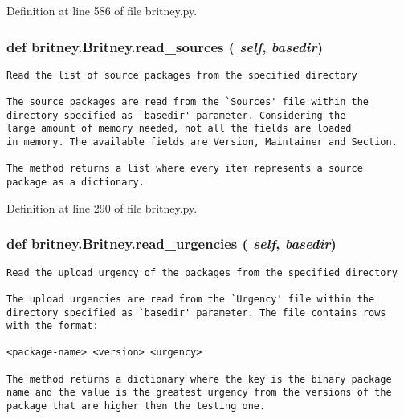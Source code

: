 Definition at line 586 of file britney.py.
\subsubsection{\setlength{\rightskip}{0pt plus 5cm}def britney.Britney.read\_\-sources ( {\em self},  {\em basedir})}\label{classbritney_1_1Britney_054f44c47f17c0c4f5a069e821b7f868}




\footnotesize\begin{verbatim}Read the list of source packages from the specified directory

The source packages are read from the `Sources' file within the
directory specified as `basedir' parameter. Considering the
large amount of memory needed, not all the fields are loaded
in memory. The available fields are Version, Maintainer and Section.

The method returns a list where every item represents a source
package as a dictionary.
\end{verbatim}
\normalsize
 

Definition at line 290 of file britney.py.
\subsubsection{\setlength{\rightskip}{0pt plus 5cm}def britney.Britney.read\_\-urgencies ( {\em self},  {\em basedir})}\label{classbritney_1_1Britney_09fc27899506b4830b1961f125a7b6a4}




\footnotesize\begin{verbatim}Read the upload urgency of the packages from the specified directory

The upload urgencies are read from the `Urgency' file within the
directory specified as `basedir' parameter. The file contains rows
with the format:

<package-name> <version> <urgency>

The method returns a dictionary where the key is the binary package
name and the value is the greatest urgency from the versions of the
package that are higher then the testing one.
\end{verbatim}
\normalsize
 

